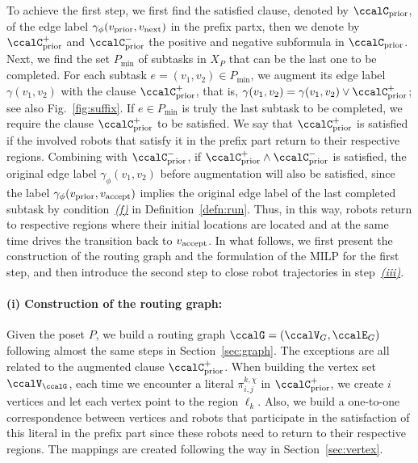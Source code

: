 \documentclass[Afour,sageh,times]{sagej}
\newcommand{\vertex}[1]{v_{\textup{#1}}}
\renewcommand{\ap}[3]{\mathcal{\pi}_{{#1},{#2}}^{#3}}
\begin{document}
{{ To achieve the first step, we first find the satisfied clause, denoted by $\ccalC_{\text{prior}}$, of the edge label $\gamma_\phi(\vertex{prior}, \vertex{next})$ in the prefix partx, then we denote by  $\ccalC_{\text{prior}}^+$ and $\ccalC_{\text{prior}}^-$ the positive and negative subformula in $\ccalC_{\text{prior}}$.
 Next, we find the set $P_{\text{min}}$ of subtasks in $X_P$ that can be the last one to be completed. %
 For each subtask $e = (v_1, v_2) \in P_{\text{min}}$, we augment its edge label $\gamma(v_1, v_2)$ with the clause $\ccalC_{\text{prior}}^+$, that is, $\gamma(v_1, v_2) = \gamma(v_1, v_2) \vee \ccalC_{\text{prior}}^+$; see also Fig.~\ref{fig:suffix}.  If $e \in P_{\text{min}}$ is truly the last subtask to be completed, we require the clause $\ccalC_{\text{prior}}^+$ to be satisfied. We say that $\ccalC_{\text{prior}}^+$ is satisfied if the involved robots that satisfy it in the prefix part return to their respective regions. Combining with $\ccalC_{\text{prior}}^-$, if $\ccalC_{\text{prior}}^+ \wedge \ccalC_{\text{prior}}^-$ is satisfied, the original edge label $\gamma_\phi(v_1, v_2)$ before augmentation will also be satisfied, since the label $\gamma_\phi(\vertex{prior}, \vertex{accept})$ implies the original edge label of the last completed subtask by condition~\hyperref[cond:f]{\it (f)} in Definition~\ref{defn:run}. Thus, in this way, robots return to respective regions where their initial locations are located and at the same time drives the transition back to $\vertex{accept}$. In what follows, we first  present the construction of the routing graph and the formulation of the MILP for the first step, and then introduce the second step to close robot trajectories in step~\hyperref[sec:closing]{\it (iii)}.
  \paragraph{(i) Construction of the routing graph:} Given the poset $P$, we build a routing graph $\ccalG = (\ccalV_G, \ccalE_G)$ following almost the same steps in Section~\ref{sec:graph}. The exceptions are all related to the augmented clause $\ccalC_{\text{prior}}^+$.   When building the vertex set $\ccalV_\ccalG$, each time we encounter a literal $\ap{i}{j}{k,\chi}$ in $\ccalC_{\text{prior}}^+$, we create $i$ vertices and let  each vertex point to the region $\ell_k$.  Also, we build a one-to-one correspondence between  vertices and robots that participate in the satisfaction of this literal in the prefix part since these robots need to return to their respective regions. The mappings are created following the way in Section~\ref{sec:vertex}.

}}
\end{document}

